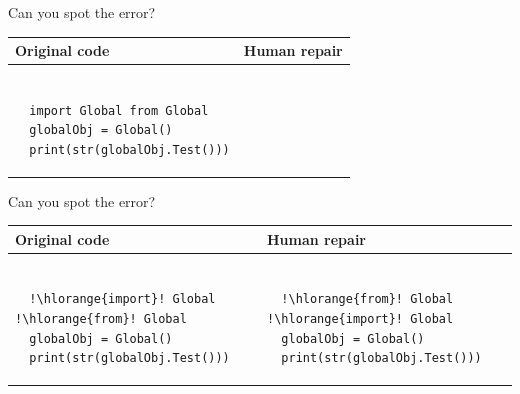 \documentclass{beamer}
\begin{document}
\begin{frame}[fragile]{Can you spot the error?}
  \begin{center}
    \begin{tabular}{|m{5.5cm}|m{5.5cm}|}
      \hline \rule{0pt}{2.5ex}\textbf{Original code}\rule[-1ex]{0pt}{2ex} &  \rule{0pt}{2.5ex}\textbf{Human repair}\rule[-1ex]{0pt}{2ex} \\\hline
      \begin{lstlisting}[escapechar=!, basicstyle=\linespread{1.3}\ttfamily\footnotesize]

  import Global from Global
  globalObj = Global()
  print(str(globalObj.Test()))

      \end{lstlisting} & \begin{lstlisting}[escapechar=!, basicstyle=\linespread{1.3}\ttfamily\footnotesize]

      \end{lstlisting} \\\hline
    \end{tabular}
  \end{center}
\end{frame}

\begin{frame}[fragile]{Can you spot the error?}
  \begin{center}
    \begin{tabular}{|m{5.5cm}|m{5.5cm}|}
      \hline \rule{0pt}{2.5ex}\textbf{Original code}\rule[-1ex]{0pt}{2ex} &  \rule{0pt}{2.5ex}\textbf{Human repair}\rule[-1ex]{0pt}{2ex} \\\hline
      \begin{lstlisting}[escapechar=!, basicstyle=\linespread{1.3}\ttfamily\footnotesize]

  !\hlorange{import}! Global !\hlorange{from}! Global
  globalObj = Global()
  print(str(globalObj.Test()))

      \end{lstlisting} & \begin{lstlisting}[escapechar=!, basicstyle=\linespread{1.3}\ttfamily\footnotesize]

  !\hlorange{from}! Global !\hlorange{import}! Global
  globalObj = Global()
  print(str(globalObj.Test()))

      \end{lstlisting} \\\hline
    \end{tabular}
  \end{center}
\end{frame}
\end{document}
